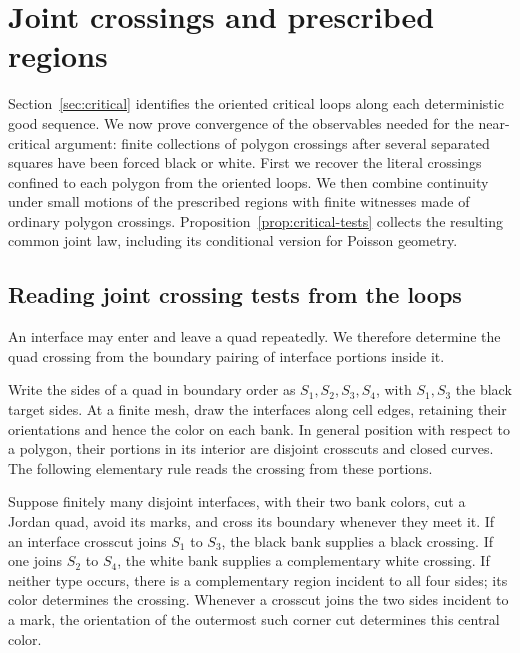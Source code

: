 \section{Joint crossings and prescribed regions}
\label{sec:critical-tests}

Section~\ref{sec:critical} identifies the oriented critical loops along
each deterministic good sequence.  We now prove convergence of the
observables needed for the near-critical argument: finite collections
of polygon crossings after several separated squares have been forced
black or white.  First we recover the literal crossings confined to
each polygon from the oriented loops.  We then combine continuity under
small motions of the prescribed regions with finite witnesses made of
ordinary polygon crossings.  Proposition~\ref{prop:critical-tests}
collects the resulting common joint law, including its conditional
version for Poisson geometry.

\subsection{Reading joint crossing tests from the loops}
\label{subsec:critical-readout}

An interface may enter and leave a quad repeatedly.  We therefore
determine the quad crossing from the boundary pairing of interface
portions inside it.

Write the sides of a quad in boundary order as $S_1,S_2,S_3,S_4$, with
$S_1,S_3$ the black target sides. At a finite mesh, draw the interfaces along
cell edges, retaining their orientations and hence the color on each bank.
In general position with respect to a polygon, their portions in its interior
are disjoint crosscuts and closed curves. The following elementary rule reads
the crossing from these portions.

\begin{lemma}\label{lem:boundary-pairing}
Suppose finitely many disjoint interfaces, with their two bank colors, cut a
Jordan quad, avoid its marks, and cross its boundary whenever they meet it.
If an interface crosscut joins $S_1$ to $S_3$, the black bank supplies a black
crossing. If one joins $S_2$ to $S_4$, the white bank supplies a complementary
white crossing. If neither type occurs, there is a complementary region
incident to all four sides; its color determines the crossing. Whenever a
crosscut joins the two sides incident to a mark, the orientation of the
outermost such corner cut determines this central color.
\end{lemma}

